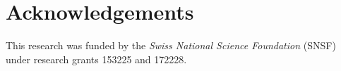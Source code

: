 \section{Acknowledgements}
\label{paper4:acknowledgements}

This research was funded by the \textit{Swiss National Science Foundation} (SNSF) under research grants 153225 and 172228.
